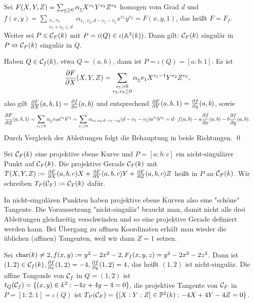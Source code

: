 \begin{lemma}
	Sei $F(X,Y,Z) = \sum_{\underline{v} \geq 0} \alpha_{\underline{v}} X^{v_1} Y^{v_2} Z^{v_3}$ homogen vom Grad $d$ und $f(x,y) = \sum_{\substack{v_1,v_2 \\ v_1 + v_2 \leq d}} \alpha_{v_1,v_2,d-v_1-v_2}x^{v_1} y^{v_2} = F(x,y,1)$, das heißt $F = F_f$. 
	Weiter sei $P \in \mathcal{C}_F(k)$ mit $P = i(Q) \in \iota(\mathbb{A}^2(k))$. 
	Dann gilt: $\mathcal{C}_F(k)$ singulär in $P \Leftrightarrow \mathcal{C}_F(k)$ singulär in $Q$.
\end{lemma}

	Haben $Q \in \mathcal{C}_f(k)$, etwa $Q = (a,b)$, dann ist $P = \iota(Q) = [a:b:1]$. 
	Es ist
	\[ \frac{\partial F}{\partial X}(X,Y,Z) = \sum_{\substack{v_1 > 0 \\ v_2, v_3 \geq 0}} \alpha_{\underline{v}} v_1 X^{v_1-1} Y^{v_2} Z^{v_3}, \]
	also gilt $\frac{\partial F}{\partial X}(a,b,1) = \frac{\partial f}{\partial x}(a,b)$ und entsprechend $\frac{\partial F}{\partial Y}(a,b,1) = \frac{\partial f}{\partial y}(a,b)$, sowie
	\[ \frac{\partial F}{\partial Z}(a,b,1) = \sum_{v_i \geq 0} \alpha_{\underline{v}} v_3 a^{v_1} b^{v_2} = \sum_{v_i \geq 0} \alpha_{v_1,v_2,d-v_1-v_2} (d-v_1-v_2) a^{v_1} b^{v_2} = d \cdot f(a,b) - a\frac{\partial f}{\partial x}(a,b) - b \frac{\partial f}{\partial y}(a,b). \]
	Durch Vergleich der Ableitungen folgt die Behauptung in beide Richtungen. \qed
	
\begin{defn}[Tangente]
	Sei $\mathcal{C}_F(k)$ eine projektive ebene Kurve und $P = [a:b:c]$ ein nicht-singulärer Punkt auf $\mathcal{C}_F(k)$. 
	Die projektive Gerade $\mathcal{C}_T(k)$ mit $T(X,Y,Z) := \frac{\partial F}{\partial X}(a,b,c)X  + \frac{\partial F}{\partial Y}(a,b,c)Y + \frac{\partial F}{\partial Z}(a,b,c)Z$ heißt  in $P$ an $\mathcal{C}_F(k)$. 
	Wir schreiben $T_P(\mathcal{C}_F) := \mathcal{C}_T(k)$ dafür.
\end{defn}

\begin{bem}
	In nicht-singulären Punkten haben projektive ebene Kurven also eine "schöne" Tangente. 
	Die Voraussetzung "nicht-singulär" braucht man, damit nicht alle drei Ableitungen gleichzeitig verschwinden und so eine projektive Gerade definiert werden kann. 
	Bei Übergang zu affinen Koordinaten erhält man wieder die üblichen (affinen) Tangenten, weil wir dann $Z = 1$ setzen.
\end{bem}

\begin{bsp}
	Sei $\operatorname{char}(k) \neq 2, f(x,y) := y^2 - 2x^2 - 2, F_f(x,y,z) = y^2-2x^2-2z^2$. 
	Dann ist $(1,2) \in \mathcal{C}_f(k)$,\linebreak $\frac{\partial f}{\partial x}(1,2) = -4, \frac{\partial f}{\partial y}(1,2) = 4$, das heißt $(1,2)$ ist nicht-singulär. 
	Die affine Tangende von $\mathcal{C}_f$ in $Q = (1,2)$ ist $t_Q(\mathcal{C}_f) = \{(x,y) \in k^2 : -4x + 4y - 4 = 0\}$, die projektive Tangente von $\mathcal{C}_F$ in $P = [1:2:1] = \iota(Q)$ ist $T_P(\mathcal{C}_F) = \{[X:Y:Z] \in \mathbb{P}^2(k) : -4X + 4Y - 4Z = 0\}$.
\end{bsp}

